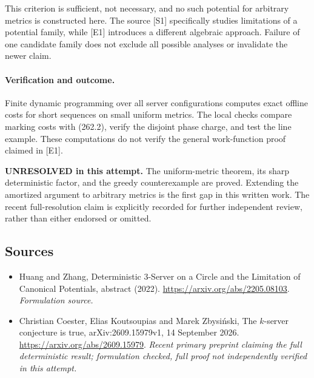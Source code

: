 \documentclass[11pt]{article}
\begin{document}
This criterion is sufficient, not necessary, and no such potential for arbitrary metrics is constructed here. The source [S1] specifically studies limitations of a potential family, while [E1] introduces a different algebraic approach. Failure of one candidate family does not exclude all possible analyses or invalidate the newer claim.

\paragraph{Verification and outcome.}
Finite dynamic programming over all server configurations computes exact offline costs for short sequences on small uniform metrics. The local checks compare marking costs with (262.2), verify the disjoint phase charge, and test the line example. These computations do not verify the general work-function proof claimed in [E1].

\textbf{UNRESOLVED in this attempt.} The uniform-metric theorem, its sharp deterministic factor, and the greedy counterexample are proved. Extending the amortized argument to arbitrary metrics is the first gap in this written work. The recent full-resolution claim is explicitly recorded for further independent review, rather than either endorsed or omitted.

\subsection{Sources}
\begin{itemize}
\item[S1]Huang and Zhang, Deterministic 3-Server on a Circle and the Limitation of Canonical Potentials, abstract (2022).
\url{https://arxiv.org/abs/2205.08103}.
\textit{Formulation source.}
\item[E1]Christian Coester, Elias Koutsoupias and Marek Zbysiński, The $k$-server conjecture is true, arXiv:2609.15979v1, 14 September 2026.
\url{https://arxiv.org/abs/2609.15979}.
\textit{Recent primary preprint claiming the full deterministic result; formulation checked, full proof not independently verified in this attempt.}
\end{itemize}
\end{document}
